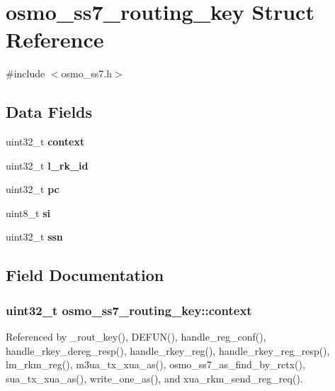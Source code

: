\section{osmo\+\_\+ss7\+\_\+routing\+\_\+key Struct Reference}
\label{structosmo__ss7__routing__key}


{\ttfamily \#include $<$osmo\+\_\+ss7.\+h$>$}

\subsection*{Data Fields}
\begin{DoxyCompactItemize}
\item 
uint32\+\_\+t {\bf context}
\item 
uint32\+\_\+t {\bf l\+\_\+rk\+\_\+id}
\item 
uint32\+\_\+t {\bf pc}
\item 
uint8\+\_\+t {\bf si}
\item 
uint32\+\_\+t {\bf ssn}
\end{DoxyCompactItemize}


\subsection{Field Documentation}
\subsubsection[{context}]{\setlength{\rightskip}{0pt plus 5cm}uint32\+\_\+t osmo\+\_\+ss7\+\_\+routing\+\_\+key\+::context}\label{structosmo__ss7__routing__key_a696716e41ed036a14e7f99648702fd52}


Referenced by \+\_\+rout\+\_\+key(), D\+E\+F\+U\+N(), handle\+\_\+reg\+\_\+conf(), handle\+\_\+rkey\+\_\+dereg\+\_\+resp(), handle\+\_\+rkey\+\_\+reg(), handle\+\_\+rkey\+\_\+reg\+\_\+resp(), lm\+\_\+rkm\+\_\+reg(), m3ua\+\_\+tx\+\_\+xua\+\_\+as(), osmo\+\_\+ss7\+\_\+as\+\_\+find\+\_\+by\+\_\+rctx(), sua\+\_\+tx\+\_\+xua\+\_\+as(), write\+\_\+one\+\_\+as(), and xua\+\_\+rkm\+\_\+send\+\_\+reg\+\_\+req().

